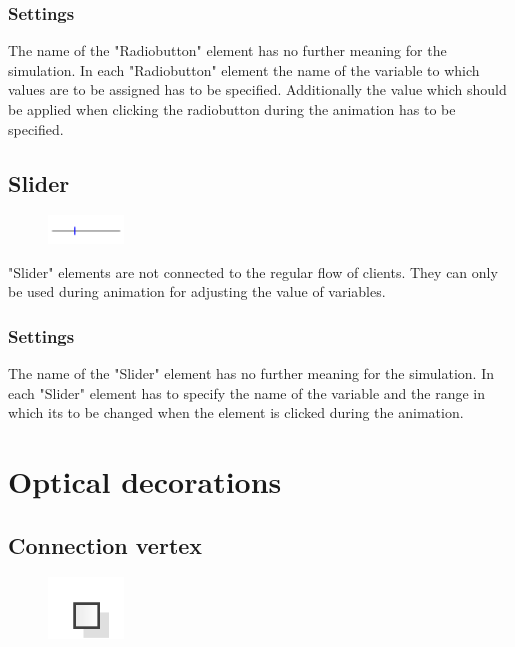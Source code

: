 \subsection*{Settings}

The name of the "Radiobutton" element has no further meaning for the simulation.
In each "Radiobutton" element the name of the variable to which values are to
be assigned has to be specified. Additionally the value which should be
applied when clicking the radiobutton during the animation has to be specified.  


\section{Slider}
\label{ref:ModelElementInteractiveSlider}

\begin{figure}
\vspace{-22pt}
\includegraphics[width=2cm]{imageModelElementInteractiveSlider.png}
\vspace{-22pt}
\end{figure}

"Slider" elements are not connected to the regular flow of clients.
They can only be used during animation for adjusting the value of
variables.

\subsection*{Settings}

The name of the "Slider" element has no further meaning for the simulation.
In each "Slider" element has to specify the name of the variable and the
range in which its to be changed when the element is clicked during the
animation.





\chapter{Optical decorations}

\section{Connection vertex}
\label{ref:ModelElementVertex}

\begin{figure}
\vspace{-22pt}
\includegraphics[width=2cm]{imageModelElementVertex.png}
\vspace{-22pt}
\end{figure}

